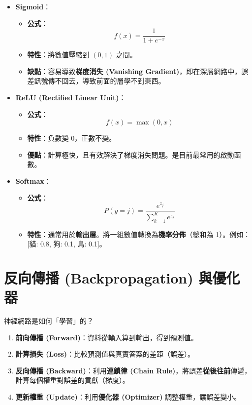 \documentclass[
  letterpaper,
  DIV=11,
  numbers=noendperiod]{scrreprt}
\providecommand{\tightlist}{%
  \setlength{\itemsep}{0pt}\setlength{\parskip}{0pt}}
\begin{document}
\begin{itemize}
\tightlist
\item
  \textbf{Sigmoid}：

  \begin{itemize}
  \tightlist
  \item
    \textbf{公式}：\[ f(x) = \frac{1}{1 + e^{-x}} \]
  \item
    \textbf{特性}：將數值壓縮到 \((0, 1)\) 之間。
  \item
    \textbf{缺點}：容易導致\textbf{梯度消失 (Vanishing
    Gradient)}，即在深層網路中，誤差訊號傳不回去，導致前面的層學不到東西。
  \end{itemize}
\item
  \textbf{ReLU (Rectified Linear Unit)}：

  \begin{itemize}
  \tightlist
  \item
    \textbf{公式}：\[ f(x) = \max(0, x) \]
  \item
    \textbf{特性}：負數變 0，正數不變。
  \item
    \textbf{優點}：計算極快，且有效解決了梯度消失問題。是目前最常用的啟動函數。
  \end{itemize}
\item
  \textbf{Softmax}：

  \begin{itemize}
  \tightlist
  \item
    \textbf{公式}：\[ P(y=j) = \frac{e^{z_j}}{\sum_{k=1}^{K} e^{z_k}} \]
  \item
    \textbf{特性}：通常用於\textbf{輸出層}。將一組數值轉換為\textbf{機率分佈}（總和為
    1）。例如：{[}貓: 0.8, 狗: 0.1, 鳥: 0.1{]}。
  \end{itemize}
\end{itemize}

\section{反向傳播 (Backpropagation) 與優化器}\label{sec-backpropagation}

神經網路是如何「學習」的？

\begin{enumerate}
\def\labelenumi{\arabic{enumi}.}
\tightlist
\item
  \textbf{前向傳播 (Forward)}：資料從輸入算到輸出，得到預測值。
\item
  \textbf{計算損失 (Loss)}：比較預測值與真實答案的差距（誤差）。
\item
  \textbf{反向傳播 (Backward)}：利用\textbf{連鎖律 (Chain
  Rule)}，將誤差\textbf{從後往前}傳遞，計算每個權重對誤差的貢獻（梯度）。
\item
  \textbf{更新權重 (Update)}：利用\textbf{優化器 (Optimizer)}
  調整權重，讓誤差變小。
\end{enumerate}
\end{document}
